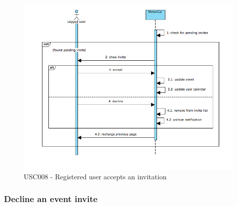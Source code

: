 \documentclass[10pt,a4paper,titlepage]{article}
\begin{document}
\begin{figure}[h]
\centering
\includegraphics[width=\linewidth]{./Sequence_diag/USC008.png}
\caption[USC008]{USC008 - Registered user accepts an invitation}
\label{fig:USC008}
\end{figure}

\clearpage
\subsubsection{Decline an event invite}
\end{document}
